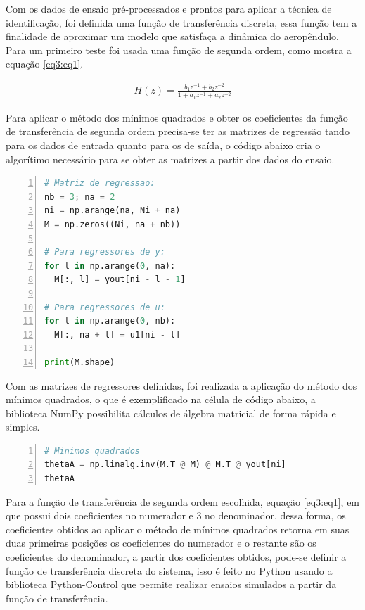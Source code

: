 Com os dados de ensaio pré-processados e prontos para aplicar a técnica de identificação, foi definida uma função de transferência discreta, essa função tem a finalidade de aproximar um modelo que satisfaça a dinâmica do aeropêndulo. Para um primeiro teste foi usada uma função de segunda ordem, como mostra a equação \ref{eq3:eq1}.

\begin{align}
    H(z) = \frac{b_1z^{-1}+b_2z^{-2}}
    {1+a_1z^{-1}+a_2z^{-2}} \label{eq3:eq1}
\end{align}

Para aplicar o método dos mínimos quadrados e obter os coeficientes da função de transferência de segunda ordem precisa-se ter as matrizes de regressão tando para os dados de entrada quanto para os de saída, o código abaixo cria o algorítimo necessário para se obter as matrizes a partir dos dados do ensaio.

\vspace{0.5cm}

\begin{lstlisting}[language=python, numbers=left, label=py3, caption={Estruturando os dados para aplicar o método dos mínimos quadrados.}]
# Matriz de regressao:
nb = 3; na = 2
ni = np.arange(na, Ni + na)
M = np.zeros((Ni, na + nb))

# Para regressores de y:
for l in np.arange(0, na):
  M[:, l] = yout[ni - l - 1]

# Para regressores de u:
for l in np.arange(0, nb):
  M[:, na + l] = u1[ni - l]

print(M.shape)
\end{lstlisting}

Com as matrizes de regressores definidas, foi realizada a aplicação do método dos mínimos quadrados, o que é exemplificado na célula de código abaixo, a biblioteca NumPy possibilita cálculos de álgebra matricial de forma rápida e simples.

\vspace{0.5cm}

\begin{lstlisting}[language=python, numbers=left, label=py3, caption={Método dos mínimos quadrados.}]
# Minimos quadrados
thetaA = np.linalg.inv(M.T @ M) @ M.T @ yout[ni]
thetaA
\end{lstlisting}

Para a função de transferência de segunda ordem escolhida, equação \ref{eq3:eq1}, em que possui dois coeficientes no numerador e 3 no denominador, dessa forma, os coeficientes obtidos ao aplicar o método de mínimos quadrados retorna em suas duas primeiras posições os coeficientes do numerador e o restante são os coeficientes do denominador, a partir dos coeficientes obtidos, pode-se definir a função de transferência discreta do sistema, isso é feito no Python usando a biblioteca Python-Control que permite realizar ensaios simulados a partir da função de transferência.

